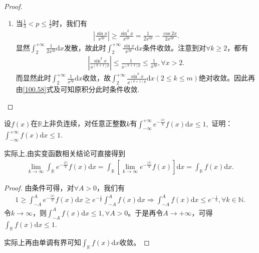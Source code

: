 \documentclass[../../main.tex]{subfiles}%
\begin{document}
\begin{proof}
\begin{enumerate}
\begin{enumerate}
\item 当\(\frac{1}{3}<p\leqslant \frac{1}{2}\)时，我们有
\begin{align*}
\left|\frac{\sin x}{x^{2p}}\right|\geqslant\frac{\sin^2 x}{x^{2p}}=\frac{1}{2x^{2p}}-\frac{\cos 2x}{2x^{2p}}.
\end{align*}
显然\(\int_{2}^{+\infty}\frac{1}{2x^{2p}}\mathrm{d}x\)发散，故此时\(\int_{2}^{+\infty}\frac{\sin x}{x^{2p}}\mathrm{d}x\)条件收敛。注意到对\(\forall k\geqslant 2\)，都有
\begin{align*}
\left|\frac{\sin^k x}{x^{(k + 1)p}}\right|\leqslant\frac{1}{x^{(k + 1)p}}\leqslant\frac{1}{x^{3p}},\forall x > 2.
\end{align*}
而显然此时\(\int_{2}^{+\infty}\frac{1}{x^{3p}}\mathrm{d}x\)收敛，故\(\int_{2}^{+\infty}\frac{\sin^k x}{x^{(k + 1)p}}\mathrm{d}x(2\leqslant  k\leqslant  m)\)绝对收敛。因此再由\eqref{100.58}式及可知原积分此时条件收敛.
\end{enumerate} 
\end{enumerate}

\end{proof}

\begin{example}
设\(f(x)\)在\(\mathbb{R}\)上非负连续，对任意正整数\(k\)有$\int_{-\infty}^{+\infty} e^{-\frac{|x|}{k}}f(x)\mathrm{d}x \leqslant  1,$
证明：$\int_{-\infty}^{+\infty}f(x)\mathrm{d}x \leqslant  1.$
\end{example}
\begin{remark}
实际上,由实变函数相关结论可直接得到
\begin{align*}
\lim_{k\rightarrow \infty}\int_{\mathbb{R}}e^{-\frac{| x |}{k}}f( x ) \mathrm{d}x=\int_{\mathbb{R}}\left[ \lim_{k\rightarrow \infty}e^{-\frac{| x |}{k}}f( x ) \right] \mathrm{d}x=\int_{\mathbb{R}}f( x ) \mathrm{d}x.
\end{align*}
\end{remark}
\begin{proof}

由条件可得，对$\forall A>0$，我们有
\begin{align*}
1\geqslant \int_{-A}^A{e^{-\frac{|x|}{k}}f(x)\mathrm{d}x}\geqslant e^{-\frac{1}{k}}\int_{-A}^A{f(x)\mathrm{d}x}\Longrightarrow \int_{-A}^A{f(x)\mathrm{d}x}\leqslant e^{-\frac{1}{k}},\forall k\in \mathbb{N} .
\end{align*}
令$k\rightarrow \infty$，则$\int_{-A}^Af( x ) \mathrm{d}x\leqslant 1,\forall A>0$。于是再令$A\rightarrow +\infty$，可得$\int_{\mathbb{R}}f( x ) \mathrm{d}x\leqslant 1.$

实际上再由单调有界可知$\int_{\mathbb{R}}f( x ) \mathrm{d}x$收敛。

\end{proof}
\end{document}
